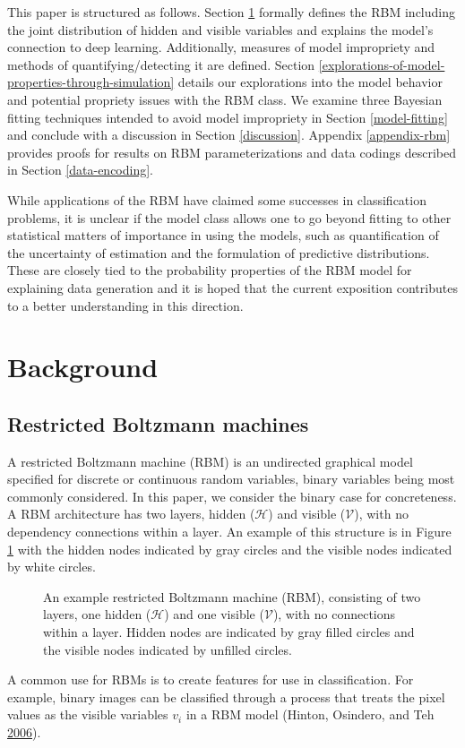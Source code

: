 \documentclass[12pt]{article}
\theoremstyle{definition}
\begin{document}
This paper is structured as follows. Section \ref{background} formally
defines the RBM including the joint distribution of hidden and visible
variables and explains the model's connection to deep learning.
Additionally, measures of model impropriety and methods of
quantifying/detecting it are defined. Section
\ref{explorations-of-model-properties-through-simulation} details our
explorations into the model behavior and potential propriety issues with
the RBM class. We examine three Bayesian fitting techniques intended to
avoid model impropriety in Section \ref{model-fitting} and conclude with
a discussion in Section \ref{discussion}. Appendix \ref{appendix-rbm}
provides proofs for results on RBM parameterizations and data codings
described in Section \ref{data-encoding}.

While applications of the RBM have claimed some successes in
classification problems, it is unclear if the model class allows one to
go beyond fitting to other statistical matters of importance in using
the models, such as quantification of the uncertainty of estimation and
the formulation of predictive distributions. These are closely tied to
the probability properties of the RBM model for explaining data
generation and it is hoped that the current exposition contributes to a
better understanding in this direction.

\section{Background}\label{background}

\subsection{Restricted Boltzmann
machines}\label{restricted-boltzmann-machines}

A restricted Boltzmann machine (RBM) is an undirected graphical model
specified for discrete or continuous random variables, binary variables
being most commonly considered. In this paper, we consider the binary
case for concreteness. A RBM architecture has two layers, hidden
(\(\mathcal{H}\)) and visible (\(\mathcal{V}\)), with no dependency
connections within a layer. An example of this structure is in Figure
\ref{fig:rbm} with the hidden nodes indicated by gray circles and the
visible nodes indicated by white circles.
\begin{figure}
  \centering
  \resizebox{\linewidth}{!}{}
  \caption{An example restricted Boltzmann machine (RBM), consisting of two layers, one hidden ($\mathcal{H}$) and one visible ($\mathcal{V}$), with no connections within a layer. Hidden nodes are indicated by gray filled circles and the visible nodes indicated by unfilled circles.}
  \label{fig:rbm}
\end{figure}
A common use for RBMs is to create features for use in classification.
For example, binary images can be classified through a process that
treats the pixel values as the visible variables \(v_i\) in a RBM model
(Hinton, Osindero, and Teh
\protect\hyperlink{ref-hinton2006fast}{2006}).
\end{document}
